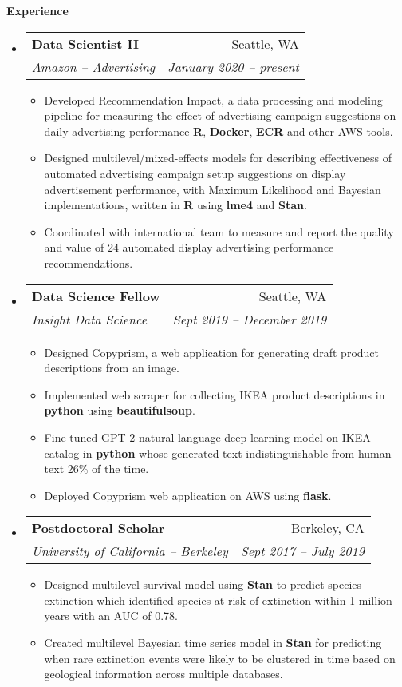 \documentclass[letterpaper,10pt]{article}
\makeatletter
\newcommand{\resitem}[1]{\item #1 \vspace{-2pt}}
\newcommand{\resheading}[1]{
  {\large \colorbox{mygrey}{\begin{minipage}{\textwidth}{\textbf{#1 \vphantom{p\^{E}}}}\end{minipage}}}
}
\newcommand{\ressubheading}[4]{
  \begin{tabular*}{6.5in}{l@{\extracolsep{\fill}}r}
    \textbf{#1} & #2 \\
    \textit{#3} & \textit{#4} \\
\end{tabular*}\vspace{-6pt}}
\makeatother
\begin{document}
\resheading{Experience}
\begin{itemize}[itemsep=0mm]
  \item 
    \ressubheading{Data Scientist II}{Seattle, WA}{Amazon -- Advertising}{January 2020 -- present}
    { %
      \begin{itemize}
        \resitem{Developed Recommendation Impact, a data processing and modeling pipeline for measuring the effect of advertising campaign suggestions on daily advertising performance \textbf{R}, \textbf{Docker}, \textbf{ECR} and other AWS tools.}
        \resitem{Designed multilevel/mixed-effects models for describing effectiveness of automated advertising campaign setup suggestions on display advertisement performance, with Maximum Likelihood and Bayesian implementations, written in \textbf{R} using \textbf{lme4} and \textbf{Stan}.}
        \resitem{Coordinated with international team to measure and report the quality and value of 24 automated display advertising performance recommendations.}
      \end{itemize}
    }
  \item 
    \ressubheading{Data Science Fellow}{Seattle, WA}{Insight Data Science}{Sept 2019 -- December 2019}
    { %
      \begin{itemize}
          \resitem{Designed Copyprism, a web application for generating draft product descriptions from an image.}
          \resitem{Implemented web scraper for collecting IKEA product descriptions in \textbf{python} using \textbf{beautifulsoup}.}
          \resitem{Fine-tuned GPT-2 natural language deep learning model on IKEA catalog in \textbf{python} whose generated text indistinguishable from human text 26\% of the time.}
          \resitem{Deployed Copyprism web application on AWS using \textbf{flask}.}
      \end{itemize}
    }
  \item 
    \ressubheading{Postdoctoral Scholar}{Berkeley, CA}{University of California -- Berkeley}{Sept 2017 -- July 2019}
    { %
      \begin{itemize}
          \resitem{Designed multilevel survival model using \textbf{Stan} to predict species extinction which identified species at risk of extinction within 1-million years with an AUC of 0.78.}
          \resitem{Created multilevel Bayesian time series model in \textbf{Stan} for predicting when rare extinction events were likely to be clustered in time based on geological information across multiple databases.}

\end{itemize}}
\end{itemize}
\end{document}
